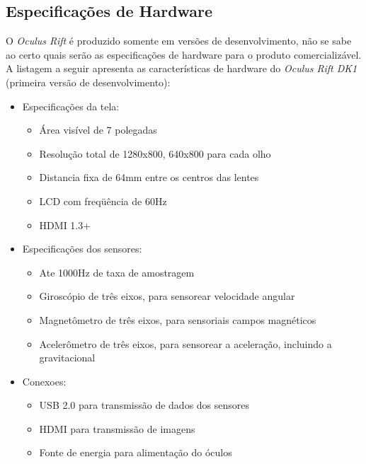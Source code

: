 \subsection{Especificações de Hardware}
O \textit{Oculus Rift} é produzido somente em versões de desenvolvimento, não se sabe ao certo quais serão as especificações de hardware para o produto comercializável. A listagem a seguir apresenta as características de hardware do \textit{Oculus Rift DK1} (primeira versão de desenvolvimento):
\begin{itemize}
	\item Especificações da tela:
		\begin{itemize}
			\item Área visível de 7 polegadas
			\item Resolução total de 1280x800, 640x800 para cada olho
			\item Distancia fixa de 64mm entre os centros das lentes
			\item LCD com freqüência de 60Hz
			\item HDMI 1.3+
		\end{itemize}
	\item Especificações dos sensores:
		\begin{itemize}
			\item Ate 1000Hz de taxa de amostragem
			\item Giroscópio de três eixos, para sensorear velocidade angular
			\item Magnetômetro de três eixos, para sensoriais campos magnéticos
			\item Acelerômetro de três eixos, para sensorear a aceleração, incluindo a gravitacional
		\end{itemize}
	\item Conexoes:
		\begin{itemize}
			\item USB 2.0 para transmissão de dados dos sensores
			\item HDMI para transmissão de imagens
			\item Fonte de energia para alimentação do óculos
		\end{itemize}
\end{itemize}

